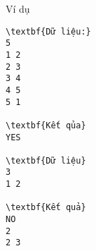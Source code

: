 Ví dụ
\begin{verbatim}
\textbf{Dữ liệu:}
5
1 2
2 3
3 4
4 5
5 1

\textbf{Kết qủa}
YES

\textbf{Dữ liệu}
3 
1 2

\textbf{Kết quả}
NO
2
2 3
\end{verbatim}